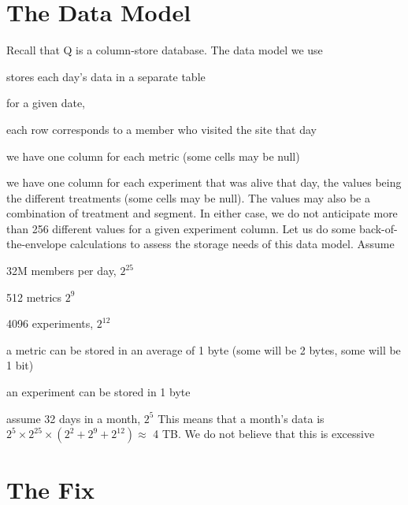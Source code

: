 \section{The Data Model}
\label{The_Data_Model}
Recall that Q is a column-store database. The data model we use 
\be
\item stores each day's data in a separate table
\item for a given date, 
\be
\item each row corresponds to a member who visited the site that day
\item we have one column for each metric (some cells may be null)
\item we have one column for each experiment that was alive that day, 
the values being the different treatments (some cells may be null). 
The values may also be a
combination of treatment and segment. In either case, we do not
anticipate more than 256 different values for a given experiment column.
\ee
\ee
Let us do some back-of-the-envelope calculations to assess the storage
needs of this data model. Assume 
\be
\item 32M members per day, \(2^{25}\)
\item 512 metrics \(2^9\)
\item 4096 experiments, \(2^{12}\)
\item a metric can be stored in an average of 1 byte (some will be 2
    bytes, some will be 1 bit)
\item an experiment can be stored in 1 byte 
\item assume 32 days in a month, \(2^5\)
\ee
This means that a month's data is 
\(2^5 \times 2^{25} \times (2^2 + 2^9 + 2^{12}) \approx \) 4 TB.
We do not believe that this is excessive
\section{The Fix}
\label{The_Fix}

